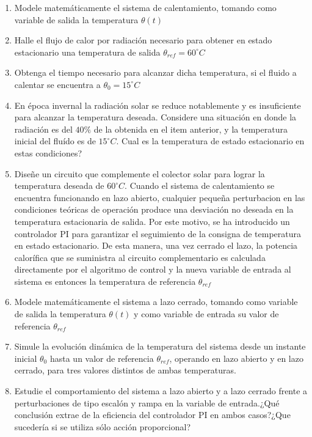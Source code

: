 \documentclass[10pt]{article}
\begin{document}
\begin{enumerate}
   \item Modele matemáticamente el sistema de calentamiento, tomando como variable de salida la temperatura $\theta(t)$ \label{item_2_1}
   \item Halle el flujo de calor por radiación necesario para obtener en estado estacionario una temperatura de salida $\theta_{ref}=60^{\circ}C$\label{item_2_2}
   \item Obtenga el tiempo necesario para alcanzar dicha temperatura, si el fluido a calentar se encuentra a $\theta_{0}=15^{\circ}C$ \label{item_2_3}
   \item En época invernal la radiación solar se reduce notablemente y es insuficiente para alcanzar la temperatura deseada. Considere una situación en donde la
      radiación es del $40\%$ de la obtenida en el item anterior, y la temperatura inicial del fluído es de $15^{\circ}C$. Cual es la temperatura de estado
      estacionario en estas condiciones?\label{item_2_4}
   \item Diseñe un circuito que complemente el colector solar para lograr la temperatura deseada de $60^{\circ}C$. Cuando el sistema de calentamiento se encuentra
      funcionando en lazo abierto, cualquier pequeña perturbacion en las condiciones teóricas de operación produce una desviación no deseada en la temperatura
      estacionaria de salida. Por este motivo, se ha introducido un controlador PI para garantizar el seguimiento de la consigna de temperatura en estado estacionario.
      De esta manera, una vez cerrado el lazo, la potencia calorífica que se suministra al circuito complementario es calculada directamente por el algoritmo de
      control y la nueva variable de entrada al sistema es entonces la temperatura de referencia $\theta_{ref}$\label{item_2_5}
   \item Modele matemáticamente el sistema a lazo cerrado, tomando como variable de salida la temperatura $\theta(t)$ y como variable de entrada su valor de referencia $\theta_{ref}$\label{item_2_6}
   \item Simule la evolución dinámica de la temperatura del sistema desde un instante inicial $\theta_{0}$ hasta un valor de referencia $\theta_{ref}$, operando\label{item_2_7}
      en lazo abierto y en lazo cerrado, para tres valores distintos de ambas temperaturas.
   \item Estudie el comportamiento del sistema a lazo abierto y a lazo cerrado frente a perturbaciones de tipo escalón y rampa en la variable de entrada.¿Qué
      conclusión extrae de la eficiencia del controlador PI en ambos casos?¿Que sucedería si se utiliza sólo acción proporcional?\label{item_2_8}
\end{enumerate}
\end{document}
